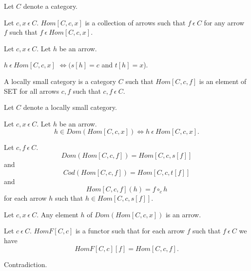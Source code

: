 \documentclass{article}
\newcommand{\mcirc}{\circ_{c}}
\newcommand{\inn}{~\epsilon~}
\newcommand{\innn}{~\epsilon~} %
\begin{document}
	
	\begin{forthel}
		
		Let $C$ denote a category.	
		
		\begin{signature}
			Let $c,x \innn C$. 
			$Hom[C,c,x]$ is a collection of arrows such that $f \inn C$ for any arrow $f$ such that $f \inn Hom[C,c,x]$.
		\end{signature}
		
		\begin{axiom} 
			Let $c,x \innn C$. Let $h$ be an arrow. 
			\begin{center}
				$h \inn Hom[C,c,x]$ $\iff (s[h]=c$ and $t[h]=x$).
			\end{center}
		\end{axiom} 
				
		\begin{definition}
			A locally small category is a category $C$ such that 
			$Hom[C,c,f]$ is an element of SET for all arrows $c,f$ such that $c,f \inn C$.
		\end{definition}
		
		
		Let $C$ denote a locally small category.
		
		\begin{axiom}
			Let $c,x \innn C$. Let $h$ be an arrow. 
			$$h \in Dom(Hom[C,c,x]) \iff h \inn Hom[C,c,x].$$
		\end{axiom}

		
		\begin{axiom}
			Let $c,f \innn C$.
			$$Dom(Hom[C,c,f]) = Hom[C,c,s[f]]$$ and 
			$$Cod(Hom[C,c,f]) = Hom[C,c,t[f]]$$ and
			$$Hom[C,c,f](h) = f \mcirc h$$ for each arrow $h$ such that $h \in Hom[C,c,s[f]]$.
		\end{axiom}

		\begin{axiom} 
			Let $c,x \innn C$. Any element $h$ of $Dom(Hom[C,c,x])$ is an arrow.
		\end{axiom}
		

		

		
		\begin{definition} 
			Let $c \innn C$.
			$HomF[C,c]$ is a functor such that 
			for each arrow $f$ such that $f \inn C$ we have $$HomF[C,c][f] = Hom[C,c,f].$$
		\end{definition}
		
		

  \begin{lemma}
  Contradiction.
  \end{lemma}
		


	\end{forthel}
	
\end{document}
